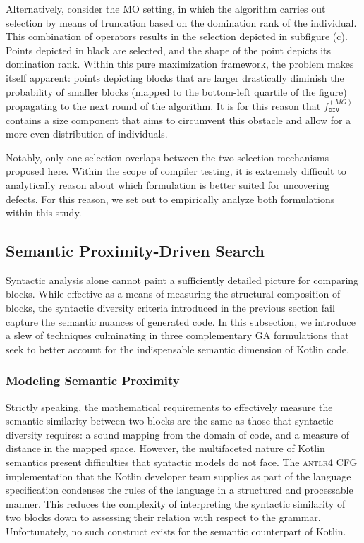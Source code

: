 Alternatively, consider the \gls{MO} setting, in which
the algorithm carries out selection by means
of truncation based on the domination rank of the individual.
This combination of operators results in the selection depicted
in subfigure (c).
Points depicted in black are selected, and the shape of the point
depicts its domination rank.
Within this pure maximization framework, the problem makes itself apparent:
points depicting blocks that are larger drastically diminish the probability
of smaller blocks (mapped to the bottom-left quartile of the figure) propagating
to the next round of the algorithm.
It is for this reason that $f^{(MO)}_{\texttt{DIV}}$ contains a size component
that aims to circumvent this obstacle and allow for a more even
distribution of individuals.

Notably, only one selection overlaps between
the two selection mechanisms proposed here.
Within the scope of compiler testing, it is extremely difficult
to analytically reason about which
formulation is better suited for uncovering defects.
For this reason, we set out to empirically analyze both
formulations within this study.

\subsection{\label{subsec:proximity-ga}Semantic Proximity-Driven Search}

Syntactic analysis alone cannot paint a sufficiently
detailed picture for comparing blocks.
While effective as a means of measuring the structural composition of
blocks, the syntactic diversity criteria introduced in the previous
section fail capture the semantic nuances of generated code.
In this subsection, we introduce a slew of techniques culminating in three
complementary \gls{GA} formulations that seek to better
account for the indispensable semantic dimension of Kotlin code. 

\subsubsection{Modeling Semantic Proximity}

Strictly speaking, the mathematical requirements to effectively
measure the semantic similarity between two blocks
are the same as those that syntactic diversity requires:
a sound mapping from the domain of code, and a measure of distance
in the mapped space.
However, the multifaceted nature of Kotlin semantics
present difficulties that syntactic models do not face.
The \textsc{antlr4} \gls{CFG} implementation that the Kotlin
developer team supplies as part of the language specification
condenses the rules of the language in a structured and processable
manner.
This reduces the complexity of interpreting the syntactic similarity
of two blocks down to assessing their relation with respect to the grammar.
Unfortunately, no such construct exists for the semantic counterpart of Kotlin.

